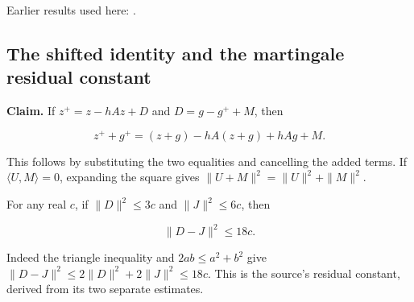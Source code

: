 \documentclass[11pt,a4paper]{report}
\begin{document}
Earlier results used here: \cite[Section~3.10.1]{LangevinLean2026ULASC}.
\subsection{\texorpdfstring{The shifted identity and the martingale residual constant}{The shifted identity and the martingale residual constant}}
\label{report-step-WassersteinMixing-ShiftedEnergy-lean-2}


\textbf{Claim.} If \(z^+=z-hAz+D\) and \(D=g-g^++M\), then

\[z^++g^+=(z+g)-hA(z+g)+hAg+M.\]


This follows by substituting the two equalities and cancelling the added terms. If \(\langle U,M\rangle=0\), expanding the square gives \(\|U+M\|^2=\|U\|^2+\|M\|^2\).




For any real \(c\), if \(\|D\|^2\le3c\) and \(\|J\|^2\le6c\), then

\[\|D-J\|^2\le18c.\]


Indeed the triangle inequality and \(2ab\le a^2+b^2\) give \(\|D-J\|^2\le2\|D\|^2+2\|J\|^2\le18c\). This is the source's residual constant, derived from its two separate estimates.
\end{document}
